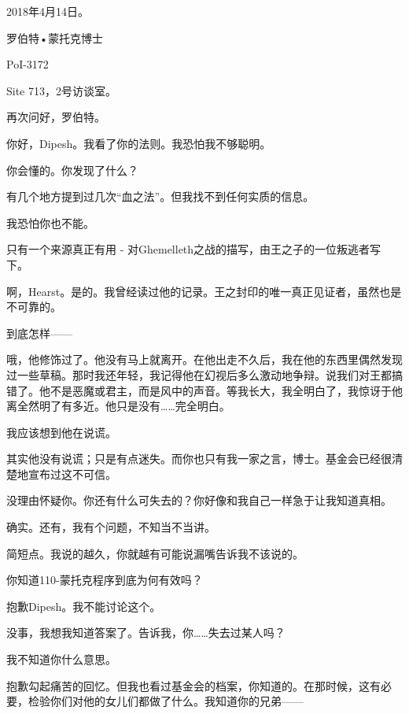 \begin{scpbox}

2018年4月14日。

罗伯特•蒙托克博士

PoI-3172

Site 713，2号访谈室。


再次问好，罗伯特。

你好，Dipesh。我看了你的法则。我恐怕我不够聪明。

你会懂的。你发现了什么？

有几个地方提到过几次“血之法”。但我找不到任何实质的信息。

我恐怕你也不能。

只有一个来源真正有用 - 对Ghemelleth之战的描写，由王之子的一位叛逃者写下。

啊，Hearst。是的。我曾经读过他的记录。王之封印的唯一真正见证者，虽然也是不可靠的。

到底怎样——

哦，他修饰过了。他没有马上就离开。在他出走不久后，我在他的东西里偶然发现过一些草稿。那时我还年轻，我记得他在幻视后多么激动地争辩。说我们对王都搞错了。他不是恶魔或君主，而是风中的声音。等我长大，我全明白了，我惊讶于他离全然明了有多近。他只是没有……完全明白。

我应该想到他在说谎。

其实他没有说谎；只是有点迷失。而你也只有我一家之言，博士。基金会已经很清楚地宣布过这不可信。

没理由怀疑你。你还有什么可失去的？你好像和我自己一样急于让我知道真相。

确实。还有，我有个问题，不知当不当讲。

简短点。我说的越久，你就越有可能说漏嘴告诉我不该说的。

你知道110-蒙托克程序到底为何有效吗？


抱歉Dipesh。我不能讨论这个。

没事，我想我知道答案了。告诉我，你……失去过某人吗？

我不知道你什么意思。

抱歉勾起痛苦的回忆。但我也看过基金会的档案，你知道的。在那时候，这有必要，检验你们对他的女儿们都做了什么。我知道你的兄弟——


\end{scpbox}
